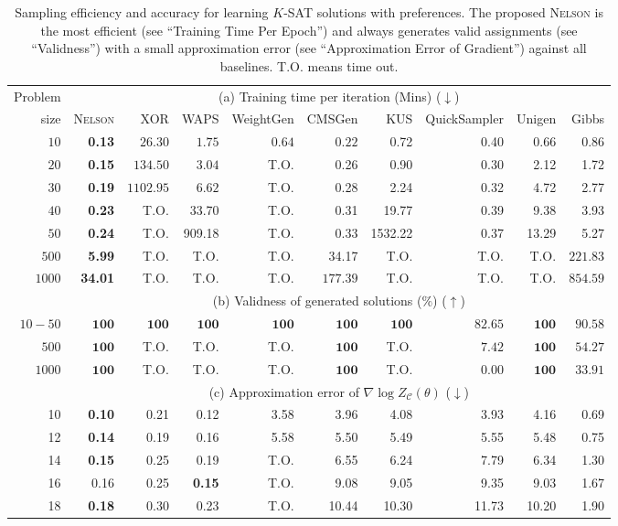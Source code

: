 \documentclass[letterpaper]{article} %
\newcommand{\nls}{\textsc{Nelson}\xspace}
\begin{document}
\begin{table}[!t]
    \centering
    \begin{tabular}{r|rrrrrrrrr}
    \hline
      Problem &\multicolumn{9}{c}{{(a) Training time per iteration} (Mins) ($\downarrow$)} \\ \cline{2-10}
     size & \nls& XOR & WAPS & WeightGen & CMSGen & KUS &QuickSampler & Unigen & Gibbs\\ \hline
$10$   & \textbf{0.13}  & $26.30$   & $1.75$ & $0.64$     & $0.22$  & 0.72& 0.40 & 0.66  & 0.86 \\
$20$   & \textbf{0.15}  & $134.50$  & $3.04$ & {T.O.}    & 0.26  & 0.90& 0.30 & 2.12  & 1.72 \\
$30$   & \textbf{0.19}  & $1102.95$ & $6.62$ & {T.O.}     & 0.28  & 2.24& 0.32 & 4.72  & 2.77 \\
$40$   & \textbf{0.23}  & T.O.   & 33.70 & {T.O.}    & 0.31  & 19.77 & 0.39 & 9.38  & 3.93 \\
$50$   & \textbf{0.24}  & T.O.   & 909.18& {T.O.}    & 0.33  & 1532.22  & 0.37 & 13.29 & 5.27 \\
$500$  & \textbf{5.99}  & T.O.   & {T.O.} & {T.O.}      & 34.17   & {T.O.} & {T.O.}  & {T.O.}   & $221.83$ \\
$1000$ & \textbf{34.01} & T.O.   & {T.O.} & {T.O.}      & $177.39$    & {T.O.} & {T.O.}  & {T.O.}   & $854.59$\\
\hline
&\multicolumn{9}{c}{(b) Validness of generated solutions ($\%$) ($\uparrow$)} \\ \hline
$10-50$ &  $\mathbf{100}$ & $\mathbf{100}$  &  $\mathbf{100}$  & $\mathbf{100}$  &  $\mathbf{100}$  & $\mathbf{100}$  &  $82.65$ & $\mathbf{100}$  & $90.58$\\
$500$ &   $\mathbf{100}$  & T.O. &  T.O. & T.O. &  $\mathbf{100}$  & T.O. &  $7.42$ & $\mathbf{100}$  & $54.27$\\
$1000$ &   $\mathbf{100}$  & T.O. &  T.O. & T.O. &  $\mathbf{100}$  & T.O. &  $0.00$ & $\mathbf{100}$  & $33.91$\\
\hline
 & \multicolumn{9}{c}{(c) Approximation error of  $\nabla\log Z_{\mathcal{C}}(\theta)$ ($\downarrow$)} \\ \hline
    10 & \textbf{0.10} & 0.21 & 0.12   & 3.58 & 3.96  & 4.08  & 3.93  & 4.16  & 0.69 \\
12 & \textbf{0.14} & 0.19 & 0.16   & 5.58 & 5.50  & 5.49  & 5.55  & 5.48  & 0.75 \\
14 & \textbf{0.15} & 0.25 & 0.19   & T.O. & 6.55  & 6.24  & 7.79  & 6.34  & 1.30 \\
16 & 0.16   & 0.25 & \textbf{0.15} & T.O. & 9.08  & 9.05  & 9.35  & 9.03  & 1.67 \\
18 & \textbf{0.18} & 0.30 & 0.23   & T.O. & 10.44 & 10.30 & 11.73 & 10.20 & 1.90 \\
\hline
    \end{tabular}
 \caption{Sampling efficiency and accuracy for learning $K$-SAT solutions with preferences. The proposed \nls is the most efficient (see ``Training Time Per Epoch'') and always generates valid assignments (see ``Validness'') with a small approximation error (see ``Approximation Error of Gradient'') against all baselines. T.O. means time out.}\label{tab:sampler}
\end{table}
\end{document}
